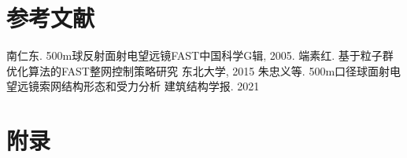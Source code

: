 \documentclass[withoutpreface,bwprint,fontset=macnew]{cumcmthesis} %
\begin{document}
	\section{参考文献}
	
	\begin{thebibliography}{9}%
		南仁东.
		\newblock 500m球反射面射电望远镜FAST\allowbreak[A]
		\newblock 中国科学G辑, 2005.
		端素红.
		\newblock 基于粒子群优化算法的FAST整网控制策略研究
		\newblock 东北大学, 2015
		 朱忠义等.
		\newblock 500m口径球面射电望远镜索网结构形态和受力分析
		\newblock 建筑结构学报. 2021
	\end{thebibliography}
	
		\newpage
	\section{附录}
\end{document}
